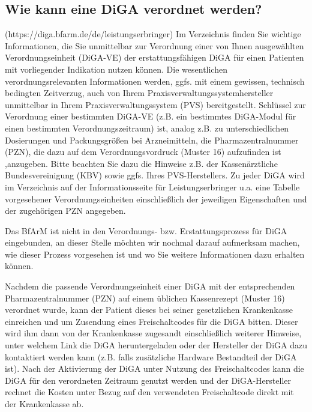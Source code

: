 \subsection{Wie kann eine DiGA verordnet werden?}

(https://diga.bfarm.de/de/leistungserbringer)
Im Verzeichnis finden Sie wichtige Informationen, die Sie unmittelbar zur Verordnung einer von Ihnen ausgewählten Verordnungseinheit (DiGA-VE) der erstattungsfähigen DiGA für einen Patienten mit vorliegender Indikation nutzen können.
Die wesentlichen verordnungsrelevanten Informationen werden, ggfs. mit einem gewissen, technisch bedingten Zeitverzug, auch von Ihrem Praxisverwaltungssystemhersteller unmittelbar in Ihrem Praxisverwaltungssystem (PVS) bereitgestellt.
Schlüssel zur Verordnung einer bestimmten DiGA-VE (z.B. ein bestimmtes DiGA-Modul für einen bestimmten Verordnungszeitraum) ist, analog z.B. zu unterschiedlichen Dosierungen und Packungsgrößen bei Arzneimitteln, die Pharmazentralnummer (PZN), die dazu auf dem Verordnungsvordruck (Muster 16) aufzufinden ist ,anzugeben.
Bitte beachten Sie dazu die Hinweise z.B. der Kassenärztliche Bundesvereinigung (KBV) sowie ggfs. Ihres PVS-Herstellers.
Zu jeder DiGA wird im Verzeichnis auf der Informationsseite für Leistungserbringer u.a. eine Tabelle vorgesehener Verordnungseinheiten einschließlich der jeweiligen Eigenschaften und der zugehörigen PZN angegeben.

Das BfArM ist nicht in den Verordnungs- bzw. Erstattungsprozess für DiGA eingebunden, an dieser Stelle möchten wir nochmal darauf aufmerksam machen, wie dieser Prozess vorgesehen ist und wo Sie weitere Informationen dazu erhalten können.

Nachdem die passende Verordnungseinheit einer DiGA mit der entsprechenden Pharmazentralnummer (PZN) auf einem üblichen Kassenrezept (Muster 16) verordnet wurde, kann der Patient dieses bei seiner gesetzlichen Krankenkasse einreichen und um Zusendung eines Freischaltcodes für die DiGA bitten. Dieser wird ihm dann von der Krankenkasse zugesandt einschließlich weiterer Hinweise, unter welchem Link die DiGA heruntergeladen oder der Hersteller der DiGA dazu kontaktiert werden kann (z.B. falls zusätzliche Hardware Bestandteil der DiGA ist).
Nach der Aktivierung der DiGA unter Nutzung des Freischaltcodes kann die DiGA für den verordneten Zeitraum genutzt werden und der DiGA-Hersteller rechnet die Kosten unter Bezug auf den verwendeten Freischaltcode direkt mit der Krankenkasse ab.

